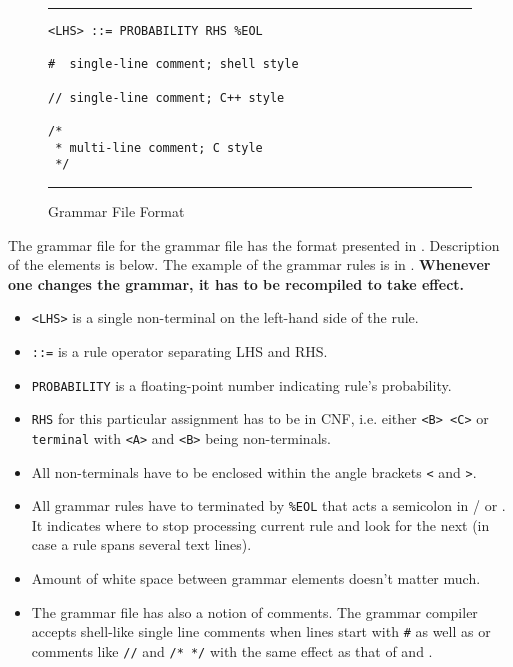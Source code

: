 \begin{figure}
\hrule\vskip4pt
\begin{verbatim}
<LHS> ::= PROBABILITY RHS %EOL

#  single-line comment; shell style

// single-line comment; C++ style

/*
 * multi-line comment; C style
 */
\end{verbatim}
\caption{Grammar File Format}
\label{fig:grammar-format}
\vskip4pt\hrule
\end{figure}


The grammar file for the grammar file has the format presented in . Description
of the elements is below. The example of the grammar rules is in .
{\bf Whenever one changes the grammar, it has to be recompiled to take effect.}

\begin{itemize}

\item
    \verb+<LHS>+ is a single non-terminal on the left-hand side of the rule.

\item
    \verb+::=+ is a rule
    operator separating LHS and RHS.

\item
    \verb+PROBABILITY+ is a floating-point number indicating rule's
    probability.

\item
    \verb+RHS+ for this particular assignment has to be in CNF, i.e. either \verb+<B> <C>+
    or \verb+terminal+ with \verb+<A>+ and \verb+<B>+ being non-terminals.

\item
    All non-terminals have to be enclosed within the angle brackets \verb+<+ and \verb+>+.

\item
    All grammar rules have to terminated by \verb+%EOL+ that acts a semicolon in {\C}/{\cpp} or
    {\java}. It indicates where to stop processing current rule and look for the next
    (in case a rule spans several text lines).

\item
    Amount of white space between grammar elements doesn't matter much.

\item
    The grammar file has also a notion of comments. The grammar compiler accepts
    shell-like single line comments when lines start with \verb+#+ as well as {\C} or {\cpp} comments
    like \verb+//+ and \verb+/* */+ with the same effect as that of {\C} and {\cpp}.

\end{itemize}


